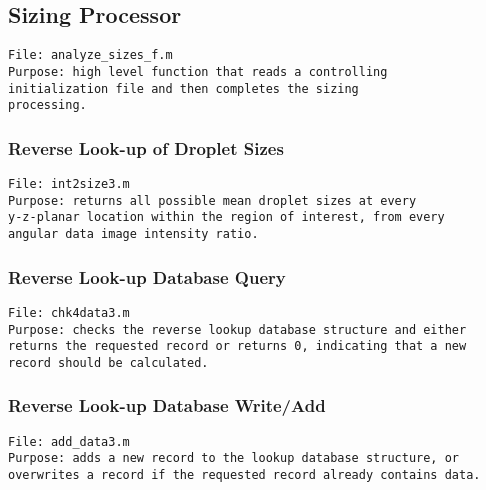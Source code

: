 

\pagebreak
\subsection{Sizing Processor}
\label{sizing_processing}

\begin{verbatim} 
File: analyze_sizes_f.m
Purpose: high level function that reads a controlling 
initialization file and then completes the sizing 
processing.
\end{verbatim}



\pagebreak
\subsubsection{Reverse Look-up of Droplet Sizes}
\begin{verbatim} 
File: int2size3.m
Purpose: returns all possible mean droplet sizes at every 
y-z-planar location within the region of interest, from every 
angular data image intensity ratio.
\end{verbatim}



\pagebreak
\subsubsection{Reverse Look-up Database Query}
\begin{verbatim} 
File: chk4data3.m
Purpose: checks the reverse lookup database structure and either
returns the requested record or returns 0, indicating that a new
record should be calculated.
\end{verbatim}



\pagebreak
\subsubsection{Reverse Look-up Database Write/Add}
\begin{verbatim} 
File: add_data3.m
Purpose: adds a new record to the lookup database structure, or 
overwrites a record if the requested record already contains data.
\end{verbatim}

